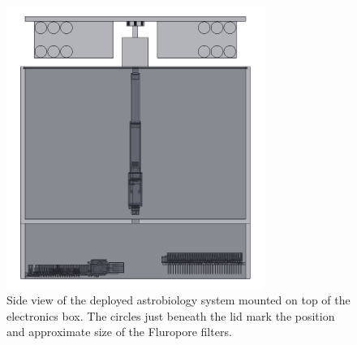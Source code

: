 \begin{figure}[H]
	\begin{center}
	\includegraphics[width=0.75\textwidth]{figures/astrobio-electronics-deployed-transparent-sideview.png}
	\caption{Side view of the deployed astrobiology system mounted on top of the electronics box. The circles just beneath the lid mark the position and approximate size of the Fluropore filters.}
	\label{fig:astrobiology-system}
	\end{center}
\end{figure}
